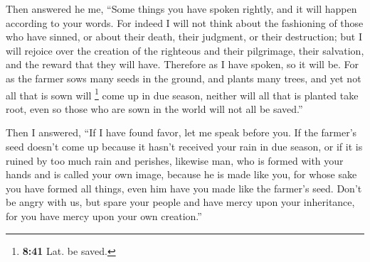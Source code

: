  Then answered he me, ``Some things you have spoken
rightly, and it will happen according to your words.  For
indeed I will not think about the fashioning of those who have sinned,
or about their death, their judgment, or their destruction;
 but I will rejoice over the creation of the righteous
and their pilgrimage, their salvation, and the reward that they will
have.  Therefore as I have spoken, so it will be.
 For as the farmer sows many seeds in the ground, and
plants many trees, and yet not all that is sown will \footnote{\textbf{8:41}
  Lat. be saved.} come up in due season, neither will all that is
planted take root, even so those who are sown in the world will not all
be saved.''

 Then I answered, ``If I have found favor, let me speak
before you.  If the farmer's seed doesn't come up because
it hasn't received your rain in due season, or if it is ruined by too
much rain and perishes,  likewise man, who is formed with
your hands and is called your own image, because he is made like you,
for whose sake you have formed all things, even him have you made like
the farmer's seed.  Don't be angry with us, but spare
your people and have mercy upon your inheritance, for you have mercy
upon your own creation.''

